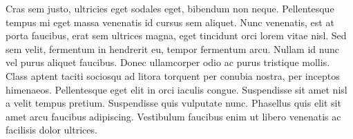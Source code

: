 Cras sem justo, ultricies eget sodales eget, bibendum non neque. Pellentesque tempus mi eget massa venenatis id cursus sem aliquet. Nunc venenatis, est at porta faucibus, erat sem ultrices magna, eget tincidunt orci lorem vitae nisl. Sed sem velit, fermentum in hendrerit eu, tempor fermentum arcu. Nullam id nunc vel purus aliquet faucibus. Donec ullamcorper odio ac purus tristique mollis. Class aptent taciti sociosqu ad litora torquent per conubia nostra, per inceptos himenaeos. Pellentesque eget elit in orci iaculis congue. Suspendisse sit amet nisl a velit tempus pretium. Suspendisse quis vulputate nunc. Phasellus quis elit sit amet arcu faucibus adipiscing. Vestibulum faucibus enim ut libero venenatis ac facilisis dolor ultrices.